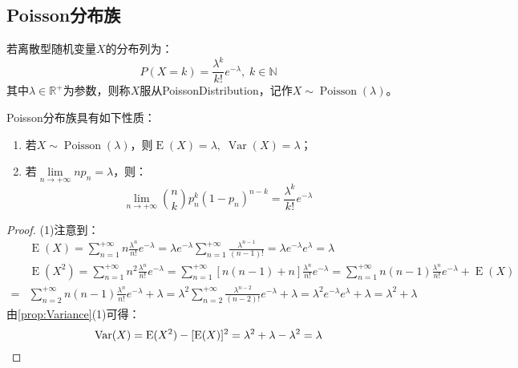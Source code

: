 \subsection{Poisson分布族}
\begin{definition}
	若离散型随机变量$X$的分布列为：
	\begin{equation*}
		P(X=k)=\frac{\lambda^k}{k!}e^{-\lambda},\;k\in\mathbb{N}
	\end{equation*}
	其中$\lambda\in\mathbb{R}^{+}$为参数，则称$X$服从\gls{PoissonDistribution}，记作$X\sim\operatorname{Poisson}(\lambda)$。
\end{definition}
\begin{property}
	Poisson分布族具有如下性质：
	\begin{enumerate}
		\item 若$X\sim\operatorname{Poisson}(\lambda)$，则$\operatorname{E}(X)=\lambda,\;\operatorname{Var}(X)=\lambda$；
		\item 若$\lim\limits_{n\to+\infty}np_n=\lambda$，则：
		\begin{equation*}
			\lim_{n\to+\infty}\binom{n}{k}p_n^k(1-p_n)^{n-k}=\frac{\lambda^k}{k!}e^{-\lambda}
		\end{equation*}
	\end{enumerate}
\end{property}
\begin{proof}
	(1)注意到：
	\begin{align*}
		&\operatorname{E}(X)=\sum_{n=1}^{+\infty}n\frac{\lambda^n}{n!}e^{-\lambda}=\lambda e^{-\lambda}\sum_{n=1}^{+\infty}\frac{\lambda^{n-1}}{(n-1)!}=\lambda e^{-\lambda}e^{\lambda}=\lambda \\
		&\operatorname{E}(X^2)=\sum_{n=1}^{+\infty}n^2\frac{\lambda^n}{n!}e^{-\lambda}=\sum_{n=1}^{+\infty}[n(n-1)+n]\frac{\lambda^n}{n!}e^{-\lambda}=\sum_{n=1}^{+\infty}n(n-1)\frac{\lambda^n}{n!}e^{-\lambda}+\operatorname{E}(X) \\
		=&\sum_{n=2}^{+\infty}n(n-1)\frac{\lambda^n}{n!}e^{-\lambda}+\lambda=\lambda^2\sum_{n=2}^{+\infty}\frac{\lambda^{n-2}}{(n-2)!}e^{-\lambda}+\lambda=\lambda^2e^{-\lambda}e^{\lambda}+\lambda=\lambda^2+\lambda
	\end{align*}
	由\cref{prop:Variance}(1)可得：
	\begin{equation*}
		\operatorname{Var}(X)=\operatorname{E}(X^2)-[\operatorname{E}(X)]^2=\lambda^2+\lambda-\lambda^2=\lambda\qedhere
	\end{equation*}
\end{proof}

